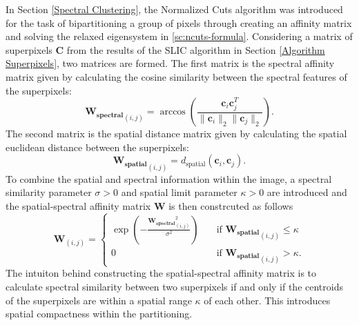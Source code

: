 In Section \ref{Spectral Clustering}, the Normalized Cuts algorithm was introduced for the task of bipartitioning a group of pixels through creating an affinity matrix and solving the relaxed eigensystem in \eqref{sc:ncuts-formula}. Considering a matrix of superpixels $\mathbf{C}$ from the results of the SLIC algorithm in Section \ref{Algorithm Superpixels}, two matrices are formed. The first matrix is the spectral affinity matrix given by calculating the cosine similarity between the spectral features of the superpixels:
\begin{equation}
    \label{nc:spectral-mtx}
    \mathbf{W_{\text{spectral}}}_{(i,j)} = \arccos\left(\frac{\mathbf{c}_i \mathbf{c}_j^T}{\|\mathbf{c}_i\|_2\|\mathbf{c}_j\|_2}\right).
\end{equation}
The second matrix is the spatial distance matrix given by calculating the spatial euclidean distance between the superpixels:
\begin{equation}
    \label{nc:spatial-mtx}
    \mathbf{W_{\text{spatial}}}_{(i,j)} = d_{\text{spatial}}(\mathbf{c}_i, \mathbf{c}_j).
\end{equation}
To combine the spatial and spectral information within the image, a spectral similarity parameter $\sigma > 0$ and spatial limit parameter $\kappa > 0$ are introduced and the spatial-spectral affinity matrix $\mathbf{W}$ is then constrcuted as follows
\begin{equation}
    \label{nc:spatial-spectral-mtx}
    \mathbf{W}_{(i,j)} = \begin{cases}
        \exp\left(-\frac{\mathbf{W_{\text{spectral}}}_{(i,j)}^2}{\sigma^2}\right) &\quad \text{if } \mathbf{W_{\text{spatial}}}_{(i,j)} \leq \kappa\\
        0 &\quad \text{if } \mathbf{W_{\text{spatial}}}_{(i,j)} > \kappa.
    \end{cases}
\end{equation}
The intuiton behind constructing the spatial-spectral affinity matrix is to calculate spectral similarity between two superpixels if and only if the centroids of the superpixels are within a spatial range $\kappa$ of each other. This introduces spatial compactness within the partitioning.

